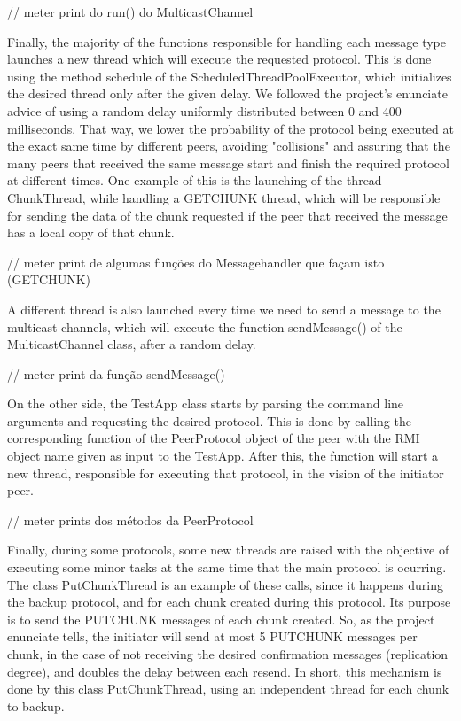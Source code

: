\documentclass[11pt]{article}
\begin{document}
// meter print do run() do MulticastChannel

Finally, the majority of the functions responsible for handling each message type launches a new thread which will execute the requested protocol.
This is done using the method schedule of the ScheduledThreadPoolExecutor, which initializes the desired thread only after the given delay.
We followed the project's enunciate advice of using a random delay uniformly distributed between 0 and 400 milliseconds.
That way, we lower the probability of the protocol being executed at the exact same time by different peers, avoiding "collisions" and assuring that the many peers that received the same message start and finish the required protocol at different times.
One example of this is the launching of the thread ChunkThread, while handling a GETCHUNK thread, which will be responsible for sending the data of the chunk requested if the peer that received the message has a local copy of that chunk.

// meter print de algumas funções do Messagehandler que façam isto (GETCHUNK)

A different thread is also launched every time we need to send a message to the multicast channels, which will execute the function sendMessage() of the MulticastChannel class, after a random delay.

// meter print da função sendMessage()

On the other side, the TestApp class starts by parsing the command line arguments and requesting the desired protocol.
This is done by calling the corresponding function of the PeerProtocol object of the peer with the RMI object name given as input to the TestApp.
After this, the function will start a new thread, responsible for executing that protocol, in the vision of the initiator peer.

// meter prints dos métodos da PeerProtocol

Finally, during some protocols, some new threads are raised with the objective of executing some minor tasks at the same time that the main protocol is ocurring.
The class PutChunkThread is an example of these calls, since it happens during the backup protocol, and for each chunk created during this protocol. Its purpose is to send the PUTCHUNK messages of each chunk created.
So, as the project enunciate tells, the initiator will send at most 5 PUTCHUNK messages per chunk, in the case of not receiving the desired confirmation messages (replication degree), and doubles the delay between each resend.
In short, this mechanism is done by this class PutChunkThread, using an independent thread for each chunk to backup.
\end{document}

